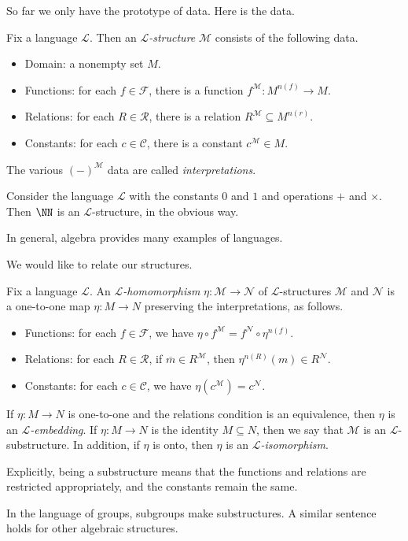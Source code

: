 \documentclass[../notes.tex]{subfiles}
\begin{document}
So far we only have the prototype of data. Here is the data.
\begin{definition}[structure]
	Fix a language $\mathcal L$. Then an \textit{$\mathcal L$-structure} $\mathcal M$ consists of the following data.
	\begin{itemize}
		\item Domain: a nonempty set $M$.
		\item Functions: for each $f\in\mathcal F$, there is a function $f^{\mathcal M}\colon M^{n(f)}\to M$.
		\item Relations: for each $R\in\mathcal R$, there is a relation $R^\mathcal M\subseteq M^{n(r)}$.
		\item Constants: for each $c\in\mathcal C$, there is a constant $c^\mathcal M\in M$.
	\end{itemize}
	The various $(-)^\mathcal M$ data are called \textit{interpretations}.
\end{definition}
\begin{example}
	Consider the language $\mathcal L$ with the constants $0$ and $1$ and operations $+$ and $\times$. Then $\NN$ is an $\mathcal L$-structure, in the obvious way.
\end{example}
In general, algebra provides many examples of languages.

We would like to relate our structures.
\begin{defihelper}   
	Fix a language $\mathcal L$. An \textit{$\mathcal L$-homomorphism} $\eta\colon\mathcal M\to\mathcal N$ of $\mathcal L$-structures $\mathcal M$ and $\mathcal N$ is a one-to-one map $\eta\colon M\to N$ preserving the interpretations, as follows.
	\begin{itemize}
		\item Functions: for each $f\in\mathcal F$, we have $\eta\circ f^\mathcal M=f^\mathcal N\circ\eta^{n(f)}$.
		\item Relations: for each $R\in\mathcal R$, if $\overline m\in R^\mathcal M$, then $\eta^{n(R)}(m)\in R^\mathcal N$.
		\item Constants: for each $c\in\mathcal C$, we have $\eta\left(c^\mathcal M\right)=c^\mathcal N$.
	\end{itemize}
	If $\eta\colon M\to N$ is one-to-one and the relations condition is an equivalence, then $\eta$ is an \textit{$\mathcal L$-embedding}. If $\eta\colon M\to N$ is the identity $M\subseteq N$, then we say that $\mathcal M$ is an $\mathcal L$-substructure. In addition, if $\eta$ is onto, then $\eta$ is an \textit{$\mathcal L$-isomorphism}.
\end{defihelper}
Explicitly, being a substructure means that the functions and relations are restricted appropriately, and the constants remain the same.
\begin{example}
	In the language of groups, subgroups make substructures. A similar sentence holds for other algebraic structures.
\end{example}
\end{document}
